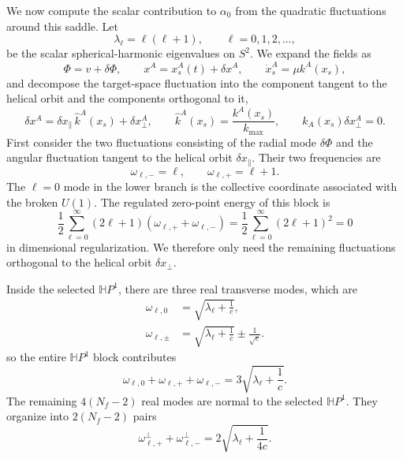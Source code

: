 \documentclass[a4paper,11pt]{article}
\begin{document}
We now compute the scalar contribution to $\alpha_0$ from the quadratic fluctuations around this saddle. Let
\begin{equation}
  \lambda_\ell=\ell(\ell+1), \qquad \ell=0,1,2,\ldots,
\end{equation}
be the scalar spherical-harmonic eigenvalues on $S^2$. We expand the fields as
\begin{equation}
    \Phi=v+\delta\Phi,
    \qquad
    x^A=x_s^A(t)+\delta x^A,
    \qquad
    \dot x_s^A=\mu k^A(x_s),
\end{equation}
and decompose the target-space fluctuation into the component tangent to the helical orbit and the components orthogonal to it,
\begin{equation}
    \delta x^A
    =
    \delta x_\parallel\,\hat k^A(x_s)
    +
    \delta x_\perp^A,
    \qquad
    \hat k^A(x_s)=\frac{k^A(x_s)}{k_{\max}},
    \qquad
    k_A(x_s)\delta x_\perp^A=0.
\end{equation}
First consider the two fluctuations consisting of the radial mode $\delta\Phi$ and the angular fluctuation tangent to the helical orbit $\delta x_\parallel$. Their two frequencies are
\begin{equation}
  \omega_{\ell,-}=\ell, \qquad \omega_{\ell,+}=\ell+1.
\end{equation}
The $\ell=0$ mode in the lower branch is the collective coordinate associated with the broken $U(1)$. The regulated zero-point energy of this block is
\begin{equation}
    \frac12\sum_{\ell=0}^{\infty}
    (2\ell+1)\left(\omega_{\ell,+}+\omega_{\ell,-}\right)
    =
    \frac12\sum_{\ell=0}^{\infty}(2\ell+1)^2
    =0
\end{equation}
in dimensional regularization. We therefore only need the remaining fluctuations orthogonal to the helical orbit $\delta x_\perp$.

Inside the selected $\mathbb HP^1$, there are three real transverse modes, which are
\begin{align}
  \omega_{\ell,0}
  &=
  \sqrt{\lambda_\ell+\frac1c},
  \\
  \omega_{\ell,\pm}
  &=
  \sqrt{\lambda_\ell+\frac1c}
  \pm\frac1{\sqrt c}.
\end{align}
so the entire $\mathbb HP^1$ block contributes 
\begin{equation}
  \omega_{\ell,0}+\omega_{\ell,+}+\omega_{\ell,-} = 3\sqrt{\lambda_\ell+\frac1c}.
\end{equation}
The remaining $4(N_f-2)$ real modes are normal to the selected $\mathbb HP^1$. They organize into $2(N_f-2)$ pairs
\begin{equation}
  \omega_{\ell,+}^{\perp}+\omega_{\ell,-}^{\perp} = 2\sqrt{\lambda_\ell+\frac1{4c}}.
\end{equation}
\end{document}
